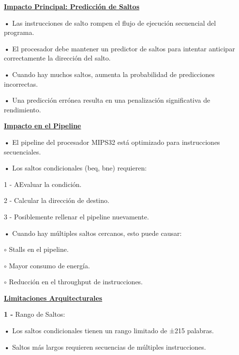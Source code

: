 \documentclass{article}
\begin{document}
\quad

\textbf{\underline{Impacto Principal: Predicción de Saltos}}

\quad

\textbf{•   } { Las instrucciones de salto rompen el flujo de ejecución secuencial del programa.}

\quad

\textbf{•   } { El procesador debe mantener un predictor de saltos para intentar anticipar correctamente la dirección del salto.}

\quad

\textbf{•   } { Cuando hay muchos saltos, aumenta la probabilidad de predicciones incorrectas.}

\quad

\textbf{•   } { Una predicción errónea resulta en una penalización significativa de rendimiento.}

\quad

\textbf{\underline{Impacto en el Pipeline}}


\quad

\textbf{•   } { El pipeline del procesador MIPS32 está optimizado para instrucciones secuenciales.}

\quad

\textbf{•   } { Los saltos condicionales (beq, bne) requieren:}

\quad

{1 -  } { AEvaluar la condición.}

{2 -  } { Calcular la dirección de destino.}

{3 -  } { Posiblemente rellenar el pipeline nuevamente.}


\quad

\textbf{•   } { Cuando hay múltiples saltos cercanos, esto puede causar:}

\quad

$\circ$ {Stalls en el pipeline.}

$\circ$ {Mayor consumo de energía.}

$\circ$ {Reducción en el throughput de instrucciones.}

\quad

\textbf{\underline{Limitaciones Arquitecturales}}

\quad

\textbf{1 -  } { Rango de Saltos:}

\quad

\textbf{•   } { Los saltos condicionales tienen un rango limitado de ±215 palabras.}

\textbf{•   } { Saltos más largos requieren secuencias de múltiples instrucciones.}
\end{document}
